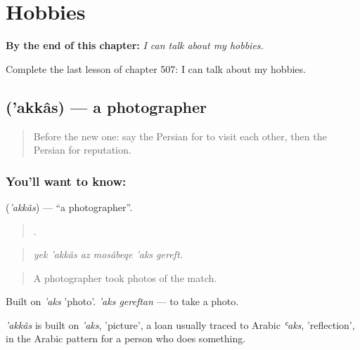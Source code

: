 
\chapter{Hobbies}
\label{ch:fa-hobbies}

\begin{chapteropening}
\textbf{By the end of this chapter:} \emph{I can talk about my hobbies.}

Complete the last lesson of chapter 507: I can talk about my hobbies.
\end{chapteropening}

\section[\texorpdfstring{\fa{عکاس} ('akkâs)}{عکاس ('akkâs)}]{ ('akkâs) — a photographer}

\label{lesson:FA-C507-akkas}



\begin{quote}
Before the new one: say the Persian for to visit each other, then the Persian for reputation.
\end{quote}

\subsection*{You'll want to know: }
\textbf{} (\emph{'akkâs}) — \textquotedblleft{}a photographer\textquotedblright{}.

\begin{quote}
     .
\end{quote}

\begin{quote}
\emph{yek 'akkâs az mosâbeqe 'aks gereft.}
\end{quote}

\begin{quote}
A photographer took photos of the match.
\end{quote}

Built on \emph{'aks} 'photo'. \emph{'aks gereftan} — to take a photo.

\begin{cousinweb}
\emph{'akkâs} is built on \emph{'aks}, 'picture', a loan usually traced to Arabic \emph{ʿaks}, 'reflection', in the Arabic pattern for a person who does something.
\end{cousinweb}

